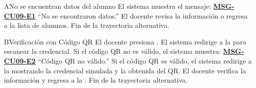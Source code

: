 \begin{UCtrayectoriaA}{A}{No se encuentran datos del alumno}
	\UCpaso El sistema muestra el mensaje: \textbf{\hyperref[msg:CU09-E1]{MSG-CU09-E1}} ``No se encontraron datos.''
	\UCpaso[\UCactor] El docente revisa la información o regresa a la lista de alumnos.
	\UCpaso Fin de la trayectoria alternativa.
\end{UCtrayectoriaA}

\begin{UCtrayectoriaA}{B}{Verificación con Código QR}
	\UCpaso[\UCactor] El docente presiona .
	\UCpaso El sistema redirige a la  para escanear la credencial.
	\UCpaso Si el código QR no es válido, el sistema muestra: \textbf{\hyperref[msg:CU09-E2]{MSG-CU09-E2}} ``Código QR no válido.''
	\UCpaso Si el código QR es válido, el sistema redirige a la  mostrando la credencial simulada y la obtenida del QR.
	\UCpaso[\UCactor] El docente verifica la información y regresa a la .
	\UCpaso Fin de la trayectoria alternativa.
\end{UCtrayectoriaA}

